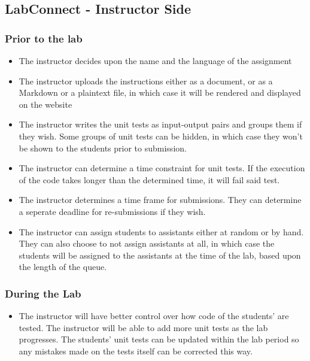 \documentclass[a4paper, 12pt]{article}
\begin{document}
    \subsection{LabConnect - Instructor Side}
    
    \subsubsection{Prior to the lab}
    
    \begin{itemize}
        \item The instructor decides upon the name and the language of the assignment
        \item The instructor uploads the instructions either as a document, or as a Markdown
          or a plaintext file, in which case it will be rendered and displayed on the website
        \item The instructor writes the unit tests as input-output pairs and groups them if
          they wish. Some groups of unit tests can be hidden, in which case they won't be
          shown to the students prior to submission.
        \item The instructor can determine a time constraint for unit tests. If the execution
          of the code takes longer than the determined time, it will fail said test.
        \item The instructor determines a time frame for submissions. They can determine a
          seperate deadline for re-submissions if they wish.
        \item The instructor can assign students to assistants either at random or by hand.
          They can also choose to not assign assistants at all, in which case the students
          will be assigned to the assistants at the time of the lab, based upon the length
          of the queue.        
    \end{itemize}
    
    \subsubsection{During the Lab}
    
    \begin{itemize}
        \item The instructor will have better control over how code of the students' are tested.
        The instructor will be able to add more unit tests as the lab progresses. 
        The students' unit tests can be updated within the lab period so any mistakes made
        on the tests itself can be corrected this way.
    \end{itemize}
    
\end{document}
